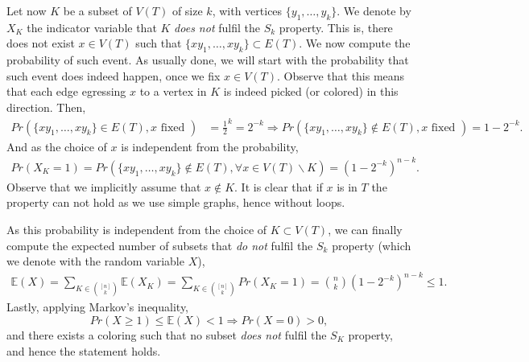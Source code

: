 \documentclass{amsart}
\theoremstyle{plain}
\begin{document}
Let now $K$ be a subset of $V(T)$ of size $k$, with vertices $\{ y_1, \dots, y_k \}$.
We denote by $X_K$ the indicator variable that $K$ \emph{does not} fulfil the $S_k$ property.
This is, there does not exist $x \in V(T)$ such that $\{xy_1, \dots, xy_k \} \subset E(T)$.
We now compute the probability of such event.
As usually done, we will start with the probability that such event does indeed happen, once we fix $x \in V(T)$.
Observe that this means that each edge egressing $x$ to a vertex in $K$ is indeed picked (or colored) in this direction.
Then,
\begin{equation*}
    \begin{split}
        Pr\left(\{xy_1, \dots, xy_k \} \in E(T), x \text{ fixed }\right) & = \frac{1}{2}^k = 2^{-k} \Rightarrow Pr\left(\{xy_1, \dots, xy_k \} \not\in E(T), x \text{ fixed }\right) = 1 - 2^{-k}.
    \end{split}
\end{equation*}
And as the choice of $x$ is independent from the probability,
\begin{equation*}
    \begin{split}
        Pr(X_K = 1) = Pr\left(\{xy_1, \dots, xy_k \} \not\in E(T), \forall x \in V(T)\backslash K \right) = \left(1 - 2^{-k}\right)^{n-k}.
    \end{split}
\end{equation*}
Observe that we implicitly assume that $x \not\in K$.
It is clear that if $x$ is in $T$ the property can not hold as we use simple graphs, hence without loops.

As this probability is independent from the choice of $K \subset V(T)$, we can finally compute the expected number of subsets that \emph{do not} fulfil the $S_k$ property (which we denote with the random variable $X$),
\begin{equation*}
    \begin{split}
        \mathbb{E}(X) = \sum_{K \in \binom{[n]}{k}} \mathbb{E}(X_K) = \sum_{K \in \binom{[n]}{k}} Pr(X_K = 1) = \binom{n}{k} (1 - 2^{-k})^{n-k} \leq 1.
    \end{split}
\end{equation*}
Lastly, applying Markov's inequality,
\begin{equation*}
    Pr(X \geq 1) \leq \mathbb{E}(X) < 1 \Rightarrow Pr(X = 0) > 0,
\end{equation*}
and there exists a coloring such that no subset \emph{does not} fulfil the $S_K$ property, and hence the statement holds.
\end{document}

